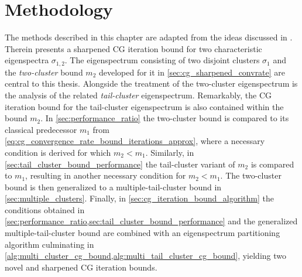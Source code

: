 \chapter{Methodology}\label{ch:methods}
The methods described in this chapter are adapted from the ideas discussed in \cite[Section 4]{cg_sharpened_convrate_Axelsson1976}. Therein \citeauthor{cg_sharpened_convrate_Axelsson1976} presents a sharpened CG iteration bound for two characteristic eigenspectra $\sigma_{1,2}$. The eigenspectrum consisting of two disjoint clusters $\sigma_1$ and the \textit{two-cluster} bound $m_2$ developed for it in \cref{sec:cg_sharpened_convrate} are central to this thesis. Alongside the treatment of the two-cluster eigenspectrum is the analysis of the related \textit{tail-cluster} eigenspectrum. Remarkably, the CG iteration bound for the tail-cluster eigenspectrum is also contained within the bound $m_2$. In \cref{sec:performance_ratio} the two-cluster bound is compared to its classical predecessor $m_1$ from \cref{eq:cg_convergence_rate_bound_iterations_approx}, where a necessary condition is derived for which $m_2 < m_1$. Similarly, in \cref{sec:tail_cluster_bound_performance} the tail-cluster variant of $m_2$ is compared to $m_1$, resulting in another necessary condition for $m_2 < m_1$. The two-cluster bound is then generalized to a multiple-tail-cluster bound in \cref{sec:multiple_clusters}. Finally, in \cref{sec:cg_iteration_bound_algorithm} the conditions obtained in \cref{sec:performance_ratio,sec:tail_cluster_bound_performance} and the generalized multiple-tail-cluster bound are combined with an eigenspectrum partitioning algorithm culminating in \cref{alg:multi_cluster_cg_bound,alg:multi_tail_cluster_cg_bound}, yielding two novel and sharpened CG iteration bounds.


